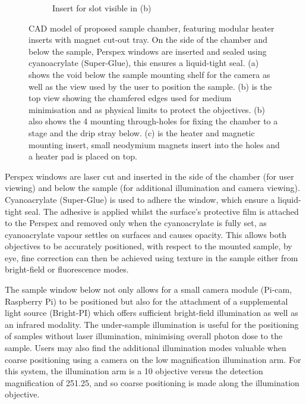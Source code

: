 \begin{figure}
\begin{subfigure}[b]{0.4\linewidth}
         \caption{Insert for slot visible in (b)}
         \label{fig:chamber_slide}
    \end{subfigure}
    \caption{CAD model of proposed sample chamber, featuring modular heater inserts with magnet cut-out tray.
    On the side of the chamber and below the sample, Perspex windows are inserted and sealed using cyanoacrylate (Super-Glue), this ensures a liquid-tight seal.
    (a) shows the void below the sample mounting shelf for the camera as well as the view used by the user to position the sample.
    (b) is the top view showing the chamfered edges used for medium minimisation and as physical limits to protect the objectives.
    (b) also shows the 4 mounting through-holes for fixing the chamber to a stage and the drip stray below.
    (c) is the heater and magnetic mounting insert, small neodymium magnets insert into the holes and a heater pad is placed on top.
    }
\end{figure}

Perspex windows are laser cut and inserted in the side of the chamber (for user viewing) and below the sample (for additional illumination and camera viewing).
Cyanoacrylate (Super-Glue) is used to adhere the window, which ensure a liquid-tight seal.
The adhesive is applied whilst the surface's protective film is attached to the Perspex and removed only when the cyanoacrylate is fully set, as cyanoacrylate vapour settles on surfaces and causes opacity.
This allows both objectives to be accurately positioned, with respect to the mounted sample, by eye, fine correction can then be achieved using texture in the sample either from bright-field or fluorescence modes.

The sample window below not only allows for a small camera module (Pi-cam, Raspberry Pi\cite{BrightPiBright}) to be positioned
but also for the attachment of a supplemental light source (Bright-PI\cite{CameraModuleV2}) which offers sufficient bright-field illumination as well as an infrared modality.
The under-sample illumination is useful for the positioning of samples without laser illumination, minimising overall photon dose to the sample.
Users may also find the additional illumination modes valuable when coarse positioning using a camera on the low magnification illumination arm.
For this system, the illumination arm is a \SI{10}{\times} objective versus the detection magnification of \SI{25}{\times}\SI{1.25}{\times}, and so coarse positioning is made along the illumination objective.

